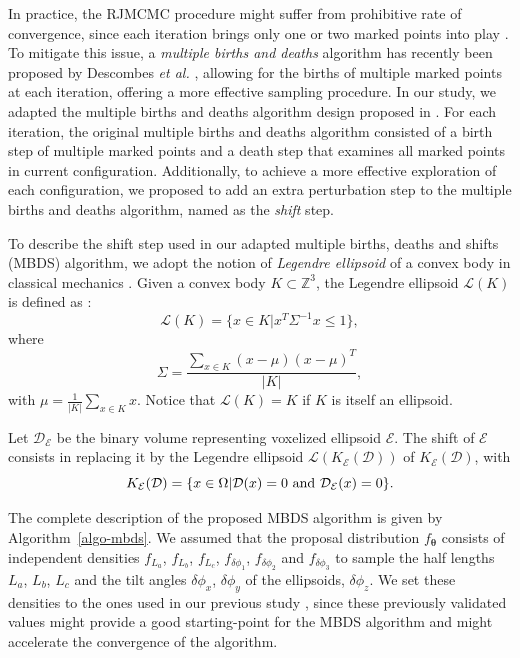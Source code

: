 \documentclass[journal]{IEEEtran}
\begin{document}
In practice, the RJMCMC procedure might suffer from prohibitive rate
of convergence, since each iteration brings only one or two marked
points into play \cite{descombes2013stochastic}. To mitigate this
issue, a \textit{multiple births and deaths} algorithm has recently
been proposed by Descombes \textit{et al.} \cite{descombes2009object},
allowing for the births of multiple marked points at each iteration,
offering a more effective sampling procedure. In our study, we adapted
the multiple births and deaths algorithm design proposed in
\cite{descombes2009object}. For each iteration, the original multiple
births and deaths algorithm consisted of a birth step of multiple
marked points and a death step that examines all marked points in
current configuration. Additionally, to achieve a more effective
exploration of each configuration, we proposed to add an extra
perturbation step to the multiple births and deaths algorithm, named
as the \textit{shift} step.

To describe the shift step used in our adapted multiple births, deaths
and shifts (MBDS) algorithm, we adopt the notion of \textit{Legendre
  ellipsoid} of a convex body in classical mechanics
\cite{lutwak2000new}. Given a convex body $K \subset \mathbb{Z}^3$,
the Legendre ellipsoid $\mathcal{L}(K)$ is defined as
\cite{ludwig2003ellipsoids}:
\begin{equation}
  \label{eq:legendre-ellip-orig}
  \mathcal{L}(K) = \{ x \in K | x^T \Sigma^{-1} x \leq 1 \},
\end{equation}
where
\begin{equation}
  \label{eq:legendre-ellip-cov}
  \Sigma = \frac{\sum_{x \in K} (x - \mu)(x - \mu)^T} {|K|},
\end{equation}
with $\mu = \frac{1}{|K|} \sum_{x \in K} x$. Notice that
$\mathcal{L}(K) = K$ if $K$ is itself an ellipsoid.

Let $\mathcal{D}_{\mathcal{E}}$ be the binary volume representing
voxelized ellipsoid $\mathcal{E}$. The shift of $\mathcal{E}$ consists
in replacing it by the Legendre ellipsoid
$\mathcal{L}(K_{\mathcal{E}}(\mathcal{D}))$ of
$K_{\mathcal{E}}(\mathcal{D})$, with
\begin{equation}
  \label{eq:legendre-ellip}
  K_{\mathcal{E}}(\mathcal{D}) = \{x \in \Omega |
  \mathcal{D}(x) = 0 \textnormal{ and } \mathcal{D}_{\mathcal{E}}(x) = 0 \}.
\end{equation}

The complete description of the proposed MBDS algorithm is given by
Algorithm~\ref{algo-mbds}. We assumed that the proposal distribution
$f_{\boldsymbol{\theta}}$ consists of independent densities $f_{L_a}$,
$f_{L_b}$, $f_{L_c}$, $f_{\delta{\phi_1}}$, $f_{\delta{\phi_2}}$ and
$f_{\delta{\phi_3}}$ to sample the half lengths $L_a$, $L_b$, $L_c$
and the tilt angles $\delta{\phi_x}$, $\delta{\phi_y}$ of the
ellipsoids, $\delta{\phi_z}$. We set these densities to the ones used
in our previous study \cite{li2016novel}, since these previously
validated values might provide a good starting-point for the MBDS
algorithm and might accelerate the convergence of the algorithm.
\end{document}
